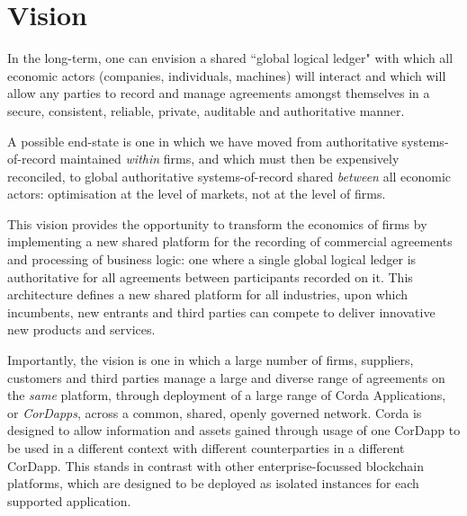 \documentclass{article}
\begin{document}
\section{Vision}
In the long-term, one can envision a shared ``global logical ledger" with which all economic actors (companies, individuals, machines) will interact and which will allow any parties to record and manage agreements amongst themselves in a secure, consistent, reliable, private, auditable and authoritative manner.

A possible end-state is one in which we have moved from authoritative systems-of-record maintained \textit{within} firms, and which must then be expensively reconciled, to global authoritative systems-of-record shared \textit{between} all economic actors: optimisation at the level of markets, not at the level of firms.

This vision provides the opportunity to transform the economics of firms by implementing a new shared platform for the recording of commercial agreements and processing of business logic: one where a single global logical ledger is authoritative for all agreements between participants recorded on it. This architecture defines a new shared platform for all industries, upon which incumbents, new entrants and third parties can compete to deliver innovative new products and services.

Importantly, the vision is one in which a large number of firms, suppliers, customers and third parties manage a large and diverse range of agreements on the \textit{same} platform, through deployment of a large range of Corda Applications, or \textit{CorDapps}, across a common, shared, openly governed network. Corda is designed to allow information and assets gained through usage of one CorDapp to be used in a different context with different counterparties in a different CorDapp. This stands in contrast with other enterprise-focussed blockchain platforms, which are designed to be deployed as isolated instances for each supported application.
\end{document}
